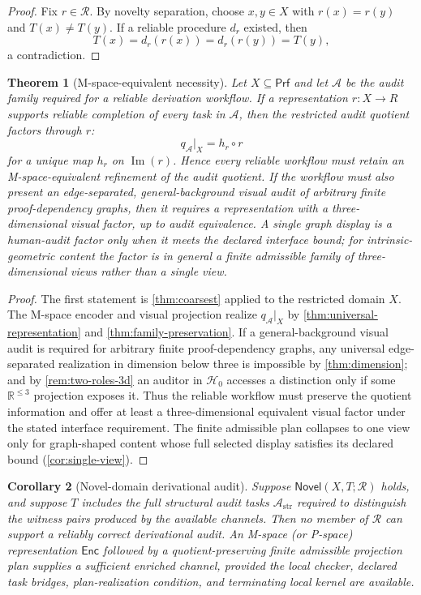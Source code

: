 \documentclass[11pt]{article}
\newcommand{\R}{\mathbb R}
\newcommand{\Prf}{\mathsf{Prf}}
\newcommand{\Enc}{\mathsf{Enc}}
\newcommand{\Novel}{\mathsf{Novel}}
\newcommand{\Img}{\operatorname{Im}}
\newcommand{\qA}{q_{\mathcal A}}
\newcommand{\mcA}{\mathcal A}
\newcommand{\mcH}{\mathcal H_0}
\theoremstyle{plain}
\newtheorem{theorem}{Theorem}[section]
\newtheorem{corollary}[theorem]{Corollary}
\theoremstyle{definition}
\theoremstyle{remark}
\begin{document}
\begin{proof}
Fix $r\in\mathcal R$.  By novelty separation, choose $x,y\in X$ with $r(x)=r(y)$ and $T(x)\neq T(y)$.  If a reliable procedure $d_r$ existed, then
\[
T(x)=d_r(r(x))=d_r(r(y))=T(y),
\]
a contradiction.
\end{proof}

\begin{theorem}[M-space-equivalent necessity]
\label{thm:mnecessary}
Let $X\subseteq\Prf$ and let $\mcA$ be the audit family required for a reliable derivation workflow.  If a representation $r:X\to R$ supports reliable completion of every task in $\mcA$, then the restricted audit quotient factors through $r$:
\[
  \qA|_X=h_r\circ r
\]
for a unique map $h_r$ on $\Img(r)$.  Hence every reliable workflow must retain an M-space-equivalent refinement of
the audit quotient.  If the workflow must also present an edge-separated,
general-background visual audit of arbitrary finite proof-dependency graphs,
then it requires a representation with a three-dimensional visual factor, up to
audit equivalence.  A single graph display is a human-audit factor only when it
meets the declared interface bound; for intrinsic-geometric content the factor
is in general a finite admissible family of three-dimensional views rather than
a single view.
\end{theorem}

\begin{proof}
The first statement is \cref{thm:coarsest} applied to the restricted domain
$X$.  The M-space encoder and visual projection realize $\qA|_X$ by
\cref{thm:universal-representation} and \cref{thm:family-preservation}.  If a
general-background visual audit is required for arbitrary finite
proof-dependency graphs, any universal edge-separated realization in dimension
below three is impossible by \cref{thm:dimension}; and by
\cref{rem:two-roles-3d} an auditor in $\mcH$ accesses a distinction only if some
$\R^{\le3}$ projection exposes it.  Thus the reliable workflow must preserve the
quotient information and offer at least a three-dimensional equivalent visual
factor under the stated interface requirement.  The finite admissible plan
collapses to one view only for graph-shaped content whose full selected display
satisfies its declared bound (\cref{cor:single-view}).
\end{proof}

\begin{corollary}[Novel-domain derivational audit]
\label{cor:novel-audit}
Suppose $\Novel(X,T;\mathcal R)$ holds, and suppose $T$ includes the full structural audit tasks $\mcA_{\mathrm{str}}$ required to distinguish the witness pairs produced by the available channels.  Then no member of $\mathcal R$ can support a reliably correct derivational
audit.  An M-space (or P-space) representation $\Enc$ followed by a
quotient-preserving finite admissible projection plan supplies a sufficient
enriched channel, provided the local checker, declared task bridges,
plan-realization condition, and terminating local kernel are available.
\end{corollary}
\end{document}
